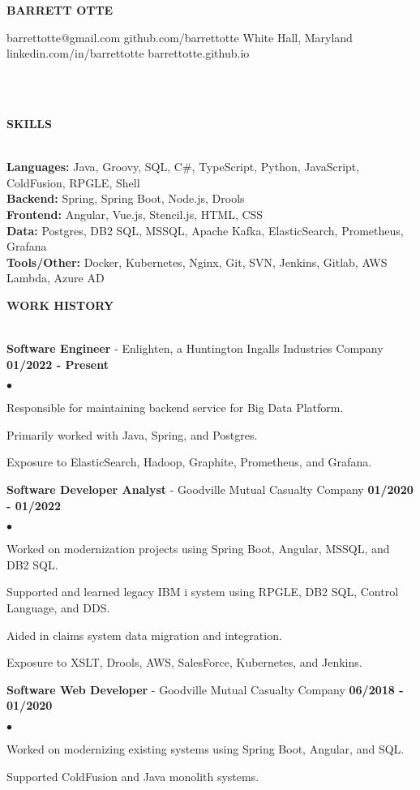 \documentclass{article}
\newcommand{\lineunder}{
	\vspace*{-4pt}\\ 
	\hspace*{-18pt}\hrulefill \\
}
\newcommand{\header}[1]{
	{\hspace*{-15pt}\vspace*{6pt}\textsc{#1}}\vspace*{-6pt}\lineunder
}
\newcommand{\employer}[3]{
	\textbf{#1} - #2 \vspace*{2pt} \hfill \textbf{#3} \vspace*{2pt}
}
\newcommand{\contact}[6]{
	\begin{center}
		{\Large \textbf \scshape \bfseries{#1}}
	\end{center}
	\small{#2} \hfill \small{#3} \break
	\small{#4} \hfill \small{#5} \break
	\hspace*{20pt} \hfill \small {#6} \break
	\vspace*{-6pt}
	\lineunder
	\vspace*{-6pt}
}
\newenvironment{resumelist}{
	\vspace*{2pt}
	\begin{list}
		{\small$\bullet$}{\topsep 0pt \itemsep -2pt}}{\vspace*{4pt}
	\end{list}
}
\newcommand{\resumeheader}[1]{
	\vspace*{10pt}
	\header{\textbf{#1}}
    \vspace*{3pt}
}
\begin{document}
	\normalsize
	\smallskip
	\vspace*{-44pt}

	\contact
		{BARRETT OTTE}
		{barrettotte@gmail.com}
		{github.com/barrettotte}
		{White Hall, Maryland}
		{linkedin.com/in/barrettotte}
		{barrettotte.github.io}

	\resumeheader{SKILLS}
		\textbf{Languages:}
			Java, Groovy, SQL, C\#, TypeScript, Python, JavaScript, ColdFusion, RPGLE, Shell\\
			\vspace*{5pt}
        \textbf{Backend:}
			Spring, Spring Boot, Node.js, Drools\\
			\vspace*{5pt}
		\textbf{Frontend:}
			Angular, Vue.js, Stencil.js, HTML, CSS\\
			\vspace*{5pt}
        \textbf{Data:}
			Postgres, DB2 SQL, MSSQL, Apache Kafka, ElasticSearch, Prometheus, Grafana\\
			\vspace*{5pt}
		\textbf{Tools/Other:}
			Docker, Kubernetes, Nginx, Git, SVN, Jenkins, Gitlab, AWS Lambda, Azure AD\\
			\vspace*{5pt}

	\resumeheader{WORK HISTORY}
		\employer
			{Software Engineer}{Enlighten, a Huntington Ingalls Industries Company}{01/2022 - Present}
			\begin{resumelist}
				\item Responsible for maintaining backend service for Big Data Platform.
				\item Primarily worked with Java, Spring, and Postgres.
				\item Exposure to ElasticSearch, Hadoop, Graphite, Prometheus, and Grafana.
			\end{resumelist}
			\vspace*{6pt}
        \employer
			{Software Developer Analyst}{Goodville Mutual Casualty Company}{01/2020 - 01/2022}
			\begin{resumelist}
				\item Worked on modernization projects using Spring Boot, Angular, MSSQL, and DB2 SQL.
				\item Supported and learned legacy IBM i system using RPGLE, DB2 SQL, Control Language, and DDS.
				\item Aided in claims system data migration and integration.
				\item Exposure to XSLT, Drools, AWS, SalesForce, Kubernetes, and Jenkins.
			\end{resumelist} 
            \vspace*{6pt}
		\employer
			{Software Web Developer}{Goodville Mutual Casualty Company}{06/2018 - 01/2020}
			\begin{resumelist}
				\item Worked on modernizing existing systems using Spring Boot, Angular, and SQL.
				\item Supported ColdFusion and Java monolith systems.
			\end{resumelist}
\end{document}
